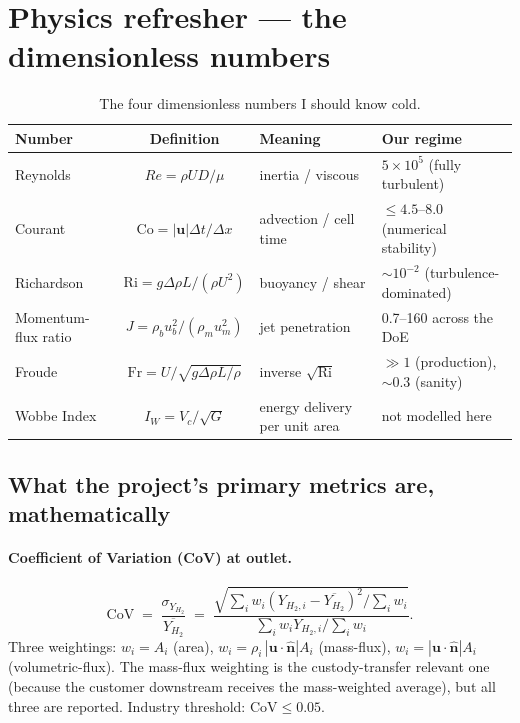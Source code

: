 \documentclass[11pt,a4paper]{article}
\newcommand{\CoV}{\ensuremath{\mathrm{CoV}}}
\newcommand{\Ri}{\ensuremath{\mathrm{Ri}}}
\newcommand{\Frnum}{\ensuremath{\mathrm{Fr}}}
\begin{document}
\clearpage
\section{Physics refresher --- the dimensionless numbers}

\begin{table}[H]
\centering
\small
\caption{The four dimensionless numbers I should know cold.}
\begin{tabular}{l c l l}
\toprule
\textbf{Number} & \textbf{Definition} & \textbf{Meaning} & \textbf{Our regime} \\
\midrule
Reynolds  & $Re = \rho U D / \mu$
          & inertia / viscous
          & $5\times 10^5$ (fully turbulent) \\
Courant   & $\mathrm{Co} = |\mathbf{u}|\Delta t/\Delta x$
          & advection / cell time
          & $\le 4.5$--$8.0$ (numerical stability) \\
Richardson & $\Ri = g\Delta\rho L /(\rho U^2)$
           & buoyancy / shear
           & $\sim 10^{-2}$ (turbulence-dominated) \\
Momentum-flux ratio & $J = \rho_b u_b^2 /(\rho_m u_m^2)$
                    & jet penetration
                    & 0.7--160 across the DoE \\
Froude    & $\Frnum = U/\sqrt{g\Delta\rho L/\rho}$
          & inverse $\sqrt{\Ri}$
          & $\gg 1$ (production), $\sim 0.3$ (sanity) \\
Wobbe Index & $I_W = V_c/\sqrt{G}$
            & energy delivery per unit area
            & not modelled here \\
\bottomrule
\end{tabular}
\end{table}

\subsection{What the project's primary metrics are, mathematically}

\paragraph{Coefficient of Variation (CoV) at outlet.}
\begin{equation}
\CoV \;=\; \frac{\sigma_{Y_{H_2}}}{\overline{Y_{H_2}}}
\;=\; \frac{\sqrt{\sum_i w_i (Y_{H_2,i}-\overline{Y_{H_2}})^2 / \sum_i w_i}}{\sum_i w_i Y_{H_2,i}/\sum_i w_i}.
\end{equation}
Three weightings:
$w_i = A_i$ (area), $w_i = \rho_i\,|\mathbf{u}\!\cdot\!\hat{\mathbf{n}}|A_i$
(mass-flux), $w_i = |\mathbf{u}\!\cdot\!\hat{\mathbf{n}}|A_i$
(volumetric-flux). The mass-flux weighting is the
custody-transfer relevant one (because the customer downstream
receives the mass-weighted average), but all three are reported.
Industry threshold: $\CoV \le 0.05$.
\end{document}
